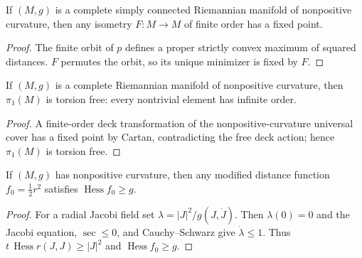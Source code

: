 \begin{theorem}
  \label{thm:pet-ch6-cartan-fixed-point}
  If $(M,g)$ is a complete simply connected Riemannian manifold of nonpositive
  curvature, then any isometry $F:M\to M$ of finite order has a fixed point.
\end{theorem}
\begin{proof}
  \sketch
  The finite orbit of \(p\) defines a proper strictly convex maximum of squared distances. \(F\) permutes the orbit, so its unique minimizer is fixed by \(F\).
\end{proof}

\begin{corollary}
  \label{cor:pet-ch6-torsion-free-fundamental-group}
  If $(M,g)$ is a complete Riemannian manifold of nonpositive curvature, then
  $\pi_1(M)$ is torsion free: every nontrivial element has infinite order.
\end{corollary}
\begin{proof}
  \sketch
  A finite-order deck transformation of the nonpositive-curvature universal cover has a fixed point by Cartan, contradicting the free deck action; hence \(\pi_1(M)\) is torsion free.
\end{proof}

\begin{lemma}
  \label{lem:pet-ch6-hessian-lower-bound}
  If $(M,g)$ has nonpositive curvature, then any modified distance function
  $f_0=\tfrac12r^2$ satisfies $\operatorname{Hess}f_0\ge g$.
\end{lemma}
\begin{proof}
  \sketch
  For a radial Jacobi field set \(\lambda=|J|^2/g(J,\dot J)\). Then \(\lambda(0)=0\) and the Jacobi equation, \(\sec\le0\), and Cauchy--Schwarz give \(\dot\lambda\le1\). Thus \(t\,\operatorname{Hess}r(J,J)\ge|J|^2\) and \(\operatorname{Hess}f_0\ge g\).
\end{proof}

